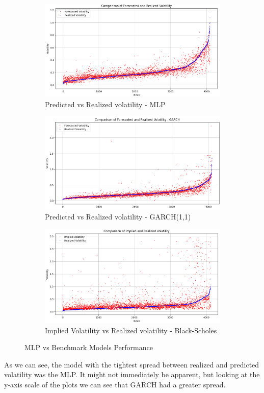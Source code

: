 \documentclass[10pt]{article}
\begin{document}
\begin{figure}[H]
\centering
\begin{subfigure}{.5\textwidth}
  \centering
  \includegraphics[width=0.6\linewidth]{MLP2-4-3e-5-30epochs.png}
  \caption{Predicted vs Realized volatility - MLP}
  \label{fig:sub1}
\end{subfigure}%
\begin{subfigure}{.5\textwidth}
  \centering
  \includegraphics[width=0.6\linewidth]{GARCH(1,1).png}
  \caption{Predicted vs Realized volatility - GARCH(1,1)}
  \label{fig:sub2}
\end{subfigure}
\begin{subfigure}{.5\textwidth}
    \centering 
    \includegraphics[width=0.6\linewidth]{Black-Scholes.png}
    \caption{Implied Volatility vs Realized volatility - Black-Scholes}
    \label{fig:sub3}
\end{subfigure}
\caption{MLP vs Benchmark Models Performance}
\label{fig:test}
\end{figure}

As we can see, the model with the tightest spread between realized and predicted volatility was the MLP. It might not immediately be apparent, but looking at the y-axis scale of the plots we can see that GARCH had a greater spread. 
\end{document}
